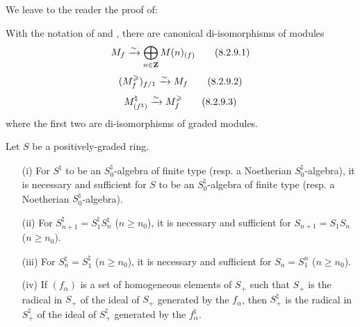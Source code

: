 We leave to the reader the proof of:
\begin{lemma}[8.2.9]
\label{II.8.2.9}
With the notation of  and , there are canonical di-isomorphisms of modules
\[
\label{II.8.2.9.1}
  M_f \xrightarrow{\sim} \bigoplus_{n\in\mathbf{Z}} M(n)_{(f)}
\tag{8.2.9.1}
\]
\[
\label{II.8.2.9.2}
  (M_f^\geqslant)_{f/1} \xrightarrow{\sim} M_f
\tag{8.2.9.2}
\]
\[
\label{II.8.2.9.3}
  M_{(f^\natural)}^\natural \xrightarrow{\sim} M_f^\geqslant
\tag{8.2.9.3}
\]
where the first two are di-isomorphisms of graded modules.
\end{lemma}

\begin{lemma}[8.2.10]
\label{II.8.2.10}
Let $S$ be a positively-graded ring.
\begin{enumerate}
  \item[\rm{(i)}] For $S^\natural$ to be an $S_0^\natural$-algebra of finite type (resp. a Noetherian $S_0^\natural$-algebra), it is necessary and sufficient for $S$ to be an $S_0^\natural$-algebra of finite type (resp. a Noetherian $S_0^\natural$-algebra).
  \item[\rm{(ii)}] For $S_{n+1}^\natural = S_1^\natural S_n^\natural$ ($n\geq n_0$), it is necessary and sufficient for $S_{n+1}=S_1S_n$ ($n\geq n_0$).
  \item[\rm{(iii)}] For $S_n^\natural = S_1^\natural$ ($n\geq n_0$), it is necessary and sufficient for $S_n=S_1^n$ ($n\geq n_0$).
  \item[\rm{(iv)}] If $(f_\alpha)$ is a set of homogeneous elements of $S_+$ such that $S_+$ is the radical in $S_+$ of the ideal of $S_+$ generated by the $f_\alpha$, then $S_+^\natural$ is the radical in $S_+^\natural$ of the ideal of $S_+^\natural$ generated by the $f_\alpha^\natural$.
\end{enumerate}
\end{lemma}


